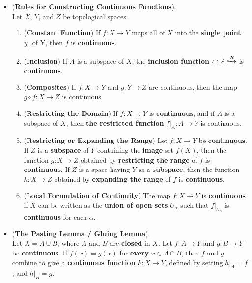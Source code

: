 \documentclass[11pt]{article}
\begin{document}
\begin{itemize}
\item \begin{proposition}(\textbf{Rules for Constructing Continuous Functions}). \citep{munkres2000topology}\\
Let $X$, $Y$, and $Z$ be topological spaces.
\begin{enumerate}
\item (\textbf{Constant Function}) If $f : X \rightarrow Y$ maps all of $X$ into the \textbf{single point} $y_0$ of Y, then $f$ is \textbf{continuous}.
\item (\textbf{Inclusion}) If $A$ is a subspace of $X$, the \textbf{inclusion function} $\iota : A \xhookrightarrow X$ is  \textbf{continuous}.
\item (\textbf{Composites}) If $f : X \rightarrow Y$ and $g : Y \rightarrow Z$ are continuous, then the map $g \circ f : X \rightarrow Z$ is continuous
\item (\textbf{Restricting the Domain}) If $f : X \rightarrow Y$ is \textbf{continuous}, and if $A$ is a subspace of $X$, then \textbf{the restricted function} $f|_{A}: A \rightarrow Y$ is continuous.
\item (\textbf{Restricting or Expanding the Range}) Let $f : X \rightarrow Y$ be \textbf{continuous}. If $Z$ is a \textbf{subspace} of $Y$ containing the \textbf{image} set $f(X)$, then the function $g : X \rightarrow Z$ obtained by \textbf{restricting the range} of $f$ is \textbf{continuous}.  If $Z$ is a space having $Y$ as a \textbf{subspace}, then the function $h : X \rightarrow Z$ obtained by \textbf{expanding the range} of $f$ is \textbf{continuous}.
\item (\textbf{Local Formulation of Continuity}) The map  $f : X \rightarrow Y$ is \textbf{continuous} if $X$ can be written as the \textbf{union of open sets} $U_{\alpha}$ such that $f|_{U_{\alpha}}$ is \textbf{continuous} for each $\alpha$.
\end{enumerate}
\end{proposition}

\item \begin{theorem} (\textbf{The Pasting Lemma / Gluing Lemma}). \citep{munkres2000topology} \\ 
Let $X = A \cup B$, where $A$ and $B$ are \textbf{closed} in $X$. Let $f : A \rightarrow Y$ and $g : B \rightarrow Y$ be \textbf{continuous}. If $f(x) = g(x)$ for \textbf{every} $x \in A \cap B$, then $f$ and $g$ combine to give a \textbf{continuous function} $h : X \rightarrow Y$, defined by setting $h|_{A} = f$, and $h|_{B} = g$.
\end{theorem}


\end{itemize}
\end{document}
